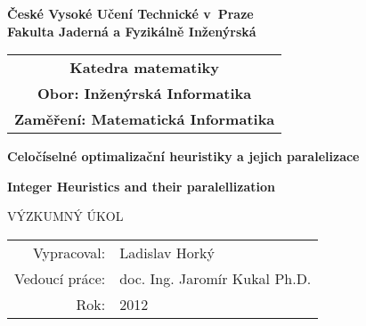 \newcommand{\cvut}{České Vysoké Učení Technické v~Praze}
\newcommand{\fjfi}{Fakulta Jaderná a Fyzikálně Inženýrská}
\newcommand{\km}{Katedra matematiky}
\newcommand{\obor}{Inženýrská Informatika}
\newcommand{\zamereni}{Matematická Informatika}

\newcommand{\nazevcz}{Celočíselné optimalizační heuristiky a jejich paralelizace}
\newcommand{\nazeven}{Integer Heuristics and their paralellization}
\newcommand{\autor}{Ladislav Horký}
\newcommand{\rok}{2012}
\newcommand{\vedouci}{doc. Ing. Jaromír Kukal Ph.D.}

\newcommand{\pracovisteVed}{Katedra softwarového inženýrství \\
    České Vysoké Učení Technické v~Praze}
\newcommand{\konzultant}{Ing. Tomáš Oberhuber Ph.D.}
\newcommand{\pracovisteKonz}{Katedra matematiky \\
    České Vysoké Učení Technické v~Praze}

\newcommand{\klicova}{Heuristické algoritmy, paralelizace GPU, CUDA}
\newcommand{\keyword}{GPU, CUDA}
\newcommand{\abstrCZ}{bla}
\newcommand{\abstrEN}{blah}


\thispagestyle{empty}

\begin{center}
	{\Large  \bf  \cvut\\[2mm] \fjfi }
	\vspace{10mm}

	\begin{tabular}{c}
	{\bf \km}\\
	{\bf Obor: \obor}\\
	{\bf Zaměření: \zamereni}
	\end{tabular}


	{\LARGE
	\textbf{\nazevcz}
	\par}

	\vspace{5mm}

	{\LARGE
	\textbf{\nazeven}
	\par}

	\vspace{30mm}
	{\Large VÝZKUMNÝ ÚKOL}

\end{center}

\vfill
{\large
\begin{tabular}{rl}
Vypracoval: & \autor\\
Vedoucí práce: & \vedouci\\
Rok: & \rok
\end{tabular}
}

